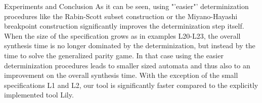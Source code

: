\documentclass[copyright,creativecommons]{eptcs}
\begin{document}
\begin{section}{Experiments and Conclusion}
As it can be seen, using "'easier"' determinization procedures like the Rabin-Scott subset construction or the Miyano-Hayashi breakpoint construction significantly improves the determinization step itself. When the size of the specification grows as in examples L20-L23, the overall synthesis time is no longer dominated by the determinization, but instead by the time to solve the generalized parity game. In that case using the easier determinization procedures leads to smaller sized automata and thus also to an improvement on the overall synthesis time. With the exception of the small specifications L1 and L2, our tool is significantly faster compared to the explicitly implemented tool Lily.

\end{section}


\end{document}
